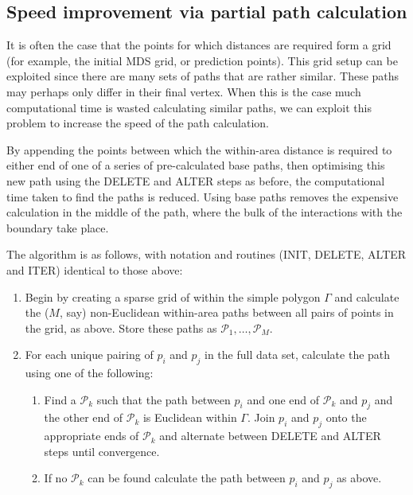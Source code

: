 \documentclass{article}
\begin{document}
\subsection*{Speed improvement via partial path calculation}

It is often the case that the points for which distances are required form a grid (for example, the initial MDS grid, or prediction points). This grid setup can be exploited since there are many sets of paths that are rather similar. These paths may perhaps only differ in their final vertex. When this is the case much computational time is wasted calculating similar paths, we can exploit this problem to increase the speed of the path calculation.

By appending the points between which the within-area distance is required to either end of one of a series of pre-calculated base paths, then optimising this new path using the DELETE and ALTER steps as before,  the computational time taken to find the paths is reduced. Using base paths removes the expensive calculation in the middle of the path, where the bulk of the interactions with the boundary take place.

The algorithm is as follows, with notation and routines (INIT, DELETE, ALTER and ITER) identical to those above:
\begin{enumerate}
 \item Begin by creating a sparse grid of within the simple polygon $\Gamma$ and calculate the ($M$, say) non-Euclidean within-area paths between all pairs of points in the grid, as above. Store these paths as $\mathcal{P}_1,\ldots, \mathcal{P}_M$.
\item For each unique pairing of $p_i$ and $p_j$ in the full data set, calculate the path using one of the following:
\begin{enumerate}
\item Find a $\mathcal{P}_k$ such that the path between $p_i$ and one end of $\mathcal{P}_k$ and $p_j$ and the other end of $\mathcal{P}_k$ is Euclidean within $\Gamma$. Join $p_i$ and $p_j$ onto the appropriate ends of $\mathcal{P}_k$ and alternate between DELETE and ALTER steps until convergence.
\item If no $\mathcal{P}_k$ can be found calculate the path between $p_i$ and $p_j$ as above. 
\end{enumerate}
\end{enumerate}
\end{document}
